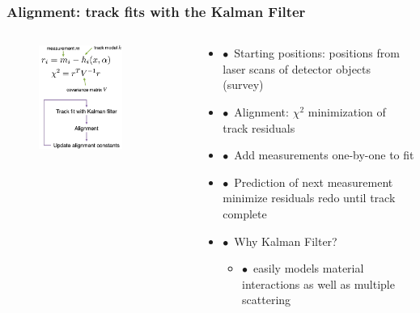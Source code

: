 \documentclass[xcolor=dvipsnames, aspectratio=1610, 12pt]{beamer}
\begin{document}
\begin{frame}\frametitle{Alignment: track fits with the Kalman Filter}
  \begin{columns}
    \begin{column}[c]{0.4\textwidth}
      \begin{figure}
        \centering
        \includegraphics[width=0.72\textwidth]{logos/kalman.png}
      \end{figure}
    \end{column}
    \begin{column}[c]{0.55\textwidth}
      \begin{itemize}
        \item $\bullet$\, Starting positions: positions from laser scans of detector objects (survey)
        \item $\bullet$\, Alignment: $\chi^2$ minimization of track residuals
        \item $\bullet$\, Add measurements one-by-one to fit
        \item $\bullet$\, Prediction of next measurement \to minimize residuals \to redo until track complete
        \item $\bullet$\, Why Kalman Filter?
        \begin{itemize}
          \item $\bullet$\, easily models material interactions as well as multiple scattering
        \end{itemize}
      \end{itemize}
    \end{column}
  \end{columns}
\end{frame}
\end{document}
